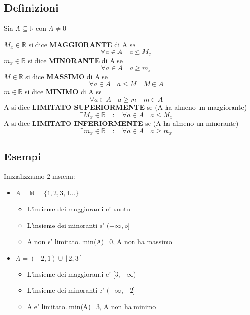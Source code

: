 \documentclass{article}
\begin{document}
   \subsection{Definizioni}
   Sia $A \subseteq \mathbb{R}$ con $A \neq 0$
   \begin{flushleft}
    $M_x \in \mathbb{R}$ si dice \textbf{MAGGIORANTE} di A se
    \begin{equation}
       \forall a \in A \quad a\leq M_x
    \end{equation}
    $m_x \in \mathbb{R}$ si dice \textbf{MINORANTE} di A se
    \begin{equation}
       \forall a \in A \quad a\geq m_x
    \end{equation}
    $M \in \mathbb{R}$ si dice \textbf{MASSIMO} di A se
    \begin{equation}
       \forall a \in A \quad a\leq M \quad M\in A
    \end{equation}
    $m \in \mathbb{R}$ si dice \textbf{MINIMO} di A se
    \begin{equation}
       \forall a \in A \quad a\geq m \quad m\in A
    \end{equation}
    A si dice \textbf{LIMITATO SUPERIORMENTE} se (A ha almeno un maggiorante)
    \begin{equation}
     \exists M_x \in \mathbb{R}\quad : \quad \forall a \in A \quad a\leq M_x
    \end{equation}
    A si dice \textbf{LIMITATO INFERIORMENTE} se (A ha almeno un minorante)
    \begin{equation}
     \exists m_x \in \mathbb{R}\quad : \quad \forall a \in A \quad a\geq m_x
    \end{equation}
   \end{flushleft}
    \begin{flushleft}
    \subsection{Esempi}
        Inizializziamo 2 insiemi:
        \begin{itemize}
           \item $A = \mathbb{N}=\{ 1,2,3,4...\}$
               \begin{itemize}
                 \item L'insieme dei maggioranti e' vuoto
                 \item L'insieme dei minoranti e' $(-\infty,o]$
                 \item A non e' limitato. min(A)=0, A non ha massimo
               \end{itemize}
           \item $A = (-2,1) \cup [2,3]$
               \begin{itemize}
                 \item L'insieme dei maggioranti e' $[3, +\infty)$
                 \item L'insieme dei minoranti e' $(-\infty,-2]$
                 \item A e' limitato. min(A)=3, A non ha minimo
               \end{itemize}
        \end{itemize}
    \end{flushleft}
\end{document}
